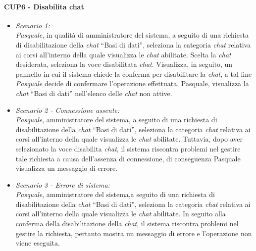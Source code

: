 \paragraph{CUP6 - Disabilita chat\\}
\begin{itemize}
	\item \textit{Scenario 1:\\}
	\textit{Pasquale}, in qualità di amministratore del sistema, a seguito di una richiesta di disabilitazione della \textit{chat} “Basi di dati”, seleziona la categoria \textit{chat} relativa ai corsi all’interno della quale visualizza le \textit{chat} abilitate. Scelta la \textit{chat} desiderata, seleziona la voce disabilitata \textit{chat}. Visualizza, in seguito, un pannello in cui il sistema chiede la conferma per disabilitare la \textit{chat}, a tal fine \textit{Pasquale} decide di confermare l’operazione effettuata. Pasquale, visualizza la \textit{chat} “Basi di dati” nell’elenco delle \textit{chat} non attive.\\
	
	\item \textit{Scenario 2 - Connessione assente:\\}
	\textit{Pasquale}, amministratore del sistema, a seguito di una richiesta di disabilitazione della \textit{chat} “Basi di dati”, seleziona la categoria \textit{chat} relativa ai corsi all’interno della quale visualizza le \textit{chat} abilitate. Tuttavia, dopo aver selezionato la voce disabilita \textit{chat}, il sistema riscontra problemi nel gestire tale richiesta a causa dell’assenza di connessione, di conseguenza Pasquale visualizza un messaggio di errore.\\
	
	\item \textit{Scenario 3 - Errore di sistema:\\}
	\textit{Pasquale}, amministratore del sistema,a seguito di una richiesta di disabilitazione della \textit{chat} “Basi di dati”, seleziona la categoria \textit{chat} relativa ai corsi all’interno della quale visualizza le \textit{chat} abilitate. In seguito alla conferma della disabilitazione della \textit{chat}, il sistema riscontra problemi nel gestire la richiesta, pertanto mostra un messaggio di errore e l’operazione non viene eseguita.\\
\end{itemize}

